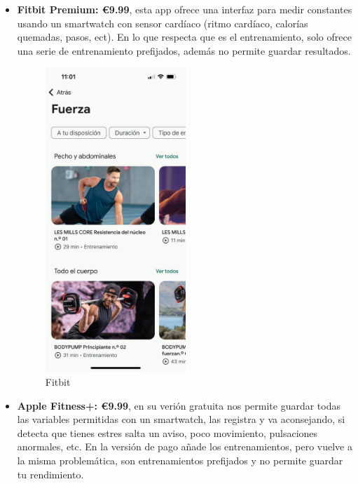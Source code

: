 \begin{itemize}
	\item \textbf{Fitbit Premium: €9.99}, esta app ofrece una interfaz para medir constantes usando un smartwatch con sensor cardíaco (ritmo cardíaco, calorías quemadas, pasos, ect). En lo que respecta que es el entrenamiento, solo ofrece una serie de entrenamiento prefijados, además no permite guardar resultados.
\begin{figure}[H]
   \centering
    \includegraphics[width=0.5\textwidth]{fotos/fitbit.jpeg}
    \caption{Fitbit}
    \label{fig:Fitbit}
\end{figure} 
	\item \textbf{Apple Fitness+: €9.99}, en su verión gratuita nos permite guardar todas las variables permitidas con un smartwatch, las registra y va aconsejando, si detecta que tienes estres salta un aviso, poco movimiento, pulsaciones anormales, etc. En la versión de pago añade los entrenamientos, pero vuelve a la misma problemática, son entrenamientos prefijados y no permite guardar tu rendimiento.
\begin{figure}[H]
   \centering

\end{figure}
\end{itemize}
